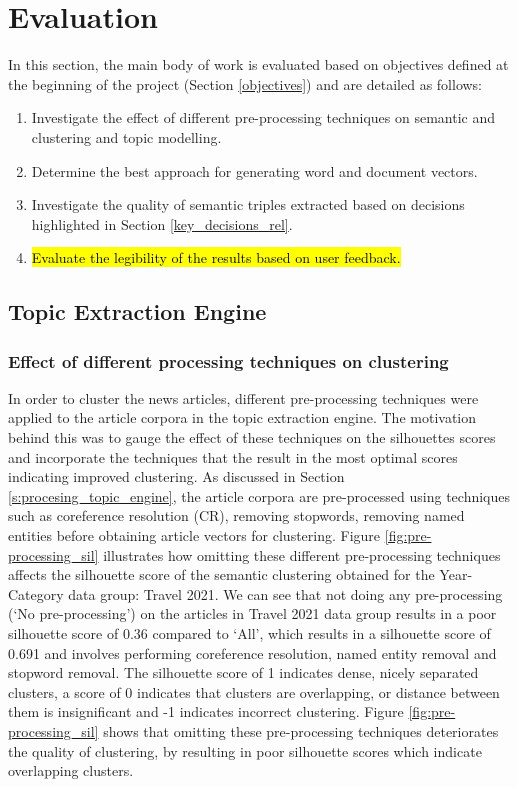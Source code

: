 \chapter{Evaluation}

In this section, the main body of work is evaluated based on objectives defined at the beginning of the project (Section \ref{objectives}) and are detailed as follows:
\begin{enumerate}
    \item Investigate the effect of different pre-processing techniques on semantic and clustering and topic modelling.
    \item Determine the best approach for generating word and document vectors.
    \item Investigate the quality of semantic triples extracted based on decisions highlighted in Section \ref{key_decisions_rel}.
    \item \hl{Evaluate the legibility of the results based on user feedback.}
\end{enumerate}



\section{Topic Extraction Engine} \label{s:evaluation_topic_extraction}

\subsection{Effect of different processing techniques on clustering} \label{s:preprocess_clustering}

In order to cluster the news articles, different pre-processing techniques were applied to the article corpora in the topic extraction engine. The motivation behind this was to gauge the effect of these techniques on the silhouettes scores and incorporate the techniques that the result in the most optimal scores indicating improved clustering. As discussed in Section \ref{s:procesing_topic_engine}, the article corpora are pre-processed using techniques such as coreference resolution (CR), removing stopwords, removing named entities before obtaining article vectors for clustering. Figure \ref{fig:pre-processing_sil} illustrates how omitting these different pre-processing techniques affects the silhouette score of the semantic clustering obtained for the Year-Category data group: Travel 2021. We can see that not doing any pre-processing (`No pre-processing') on the articles in Travel 2021 data group results in a poor silhouette score of 0.36 compared to `All', which results in a silhouette score of 0.691 and involves performing coreference resolution, named entity removal and stopword removal. The silhouette score of 1 indicates dense, nicely separated clusters, a score of 0 indicates that clusters are overlapping, or distance between them is insignificant and -1 indicates incorrect clustering. Figure  \ref{fig:pre-processing_sil} shows that omitting these pre-processing techniques deteriorates the quality of clustering, by resulting in poor silhouette scores which indicate overlapping clusters.

